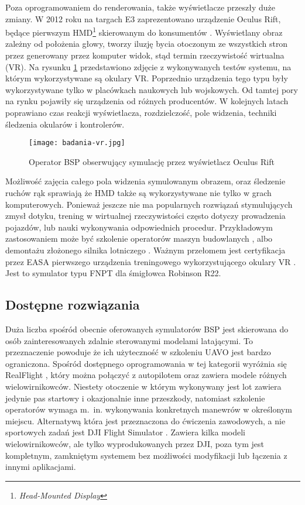Poza oprogramowaniem do renderowania, także wyświetlacze przeszły duże zmiany. W 2012 roku na targach E3 zaprezentowano urządzenie Oculus Rift, będące pierwszym HMD\footnote{\emph{Head-Mounted Display}} skierowanym do konsumentów \cite{rubin2014}. Wyświetlany obraz zależny od położenia głowy, tworzy iluzję bycia otoczonym ze wszystkich stron przez generowany przez komputer widok, stąd termin rzeczywistość wirtualna (VR). Na rysunku \ref{fig:badania-vr} przedstawiono zdjęcie z wykonywanych testów systemu, na którym wykorzystywane są okulary VR. Poprzednio urządzenia tego typu były wykorzystywane tylko w placówkach naukowych lub wojskowych. Od tamtej pory na rynku pojawiły się urządzenia od różnych producentów. W kolejnych latach poprawiano czas reakcji wyświetlacza, rozdzielczość, pole widzenia, techniki śledzenia okularów i kontrolerów.

\begin{figure}[!h]
    \centering \texttt{[image: badania-vr.jpg]}
    \caption{Operator BSP obserwujący symulację przez wyświetlacz Oculus Rift}
    \label{fig:badania-vr}
\end{figure}

Możliwość zajęcia całego pola widzenia symulowanym obrazem, oraz śledzenie ruchów rąk sprawiają że HMD także są wykorzystywane nie tylko w grach komputerowych. Ponieważ jeszcze nie ma popularnych rozwiązań stymulujących zmysł dotyku, trening w wirtualnej rzeczywistości często dotyczy prowadzenia pojazdów, lub nauki wykonywania odpowiednich procedur. Przykładowym zastosowaniem może być szkolenie operatorów maszyn budowlanych \cite{cmlabs2021}, albo demontażu złożonego silnika lotniczego \cite{inlusion2020}. Ważnym przełomem jest certyfikacja przez EASA pierwszego urządzenia treningowego wykorzystującego okulary VR \cite{easavr2021}. Jest to symulator typu FNPT dla śmigłowca Robinson R22.

\subsection{Dostępne rozwiązania}
Duża liczba spośród obecnie oferowanych symulatorów BSP jest skierowana do osób zainteresowanych zdalnie sterowanymi modelami latającymi. To przeznaczenie powoduje że ich użyteczność w szkoleniu UAVO jest bardzo ograniczona. Spośród dostępnego oprogramowania w tej kategorii wyróżnia się RealFlight \cite{realflight}, który można połączyć z autopilotem oraz zawiera modele różnych wielowirnikowców. Niestety otoczenie w którym wykonywany jest lot zawiera jedynie pas startowy i okazjonalnie inne przeszkody, natomiast szkolenie operatorów wymaga m.~in. wykonywania konkretnych manewrów w określonym miejscu. Alternatywą która jest przeznaczona do ćwiczenia zawodowych, a nie sportowych zadań jest DJI Flight Simulator \cite{djifs}. Zawiera kilka modeli wielowirnikowców, ale tylko wyprodukowanych przez DJI, poza tym jest kompletnym, zamkniętym systemem bez możliwości modyfikacji lub łączenia z innymi aplikacjami.

